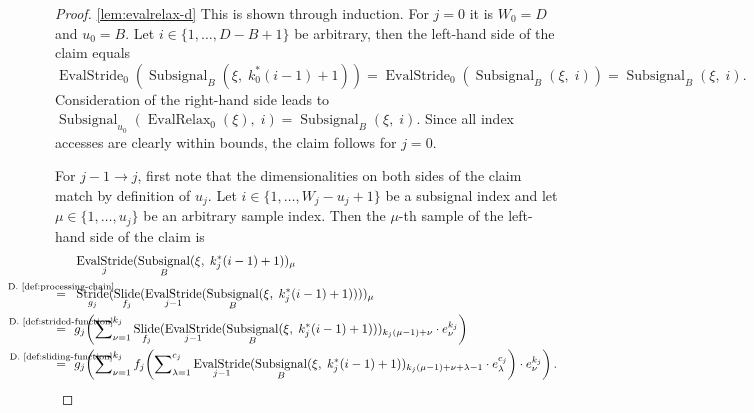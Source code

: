 \documentclass[journal]{IEEEtran}
\newcommand{\ROI}{B}
\newcommand{\discint}[2]{\{#1,\dotsc,#2\}}
\newcommand{\inint}[2]{\in\discint{#1}{#2}}
\DeclareMathOperator{\Subsignal}{Subsignal}
\DeclareMathOperator{\Slide}{Slide}
\DeclareMathOperator{\Stride}{Stride}
\DeclareMathOperator{\EvalStride}{EvalStride}
\newcommand{\equsing}[1]{\overset{\mathclap{\text{#1}}}{=}}
\DeclareMathOperator{\EvalRelax}{EvalRelax}
\begin{document}
\begin{proof}
\ref{lem:evalrelax-d}
This is shown through induction.
For $j = 0$ it is $W_0 = D$ and $u_0 = \ROI$.
Let $i\inint{1}{D - \ROI + 1}$ be arbitrary, then the left-hand side of the claim equals
\begin{displaymath}
  \EvalStride_0(\Subsignal_\ROI(\xi,\; k_0^*(i - 1) + 1)) = \EvalStride_0(\Subsignal_\ROI(\xi,\; i)) = \Subsignal_\ROI(\xi,\; i)\text{.}
\end{displaymath}
Consideration of the right-hand side leads to $\Subsignal_{u_0}(\EvalRelax_0(\xi),\; i) = \Subsignal_\ROI(\xi,\; i)$.
Since all index accesses are clearly within bounds, the claim follows for $j = 0$.

For $j - 1 \to j$, first note that the dimensionalities on both sides of the claim match by definition of $u_j$.
Let $i\inint{1}{W_j - u_j + 1}$ be a subsignal index and let $\mu\inint{1}{u_j}$ be an arbitrary sample index.
Then the $\mu$-th sample of the left-hand side of the claim is
\begin{align*}
  & \EvalStride_j(\Subsignal_\ROI(\xi,\; k_j^*(i - 1) + 1))_\mu\\
  \equsing{D.~\ref{def:processing-chain}}\ \ & \Stride_{g_j}(\Slide_{f_j}(\EvalStride_{j - 1}(\Subsignal_\ROI(\xi,\; k_j^*(i - 1) + 1))))_\mu\\
  \equsing{D.~\ref{def:strided-function}}\ \ & g_j\!\left( \sum\nolimits_{\nu = 1}^{k_j} \Slide_{f_j}(\EvalStride_{j - 1}(\Subsignal_\ROI(\xi,\; k_j^*(i - 1) + 1)))_{k_j(\mu - 1) + \nu}\cdot e_\nu^{k_j} \right)\\
  \equsing{D.~\ref{def:sliding-function}}\ \ & g_j\!\left( \sum\nolimits_{\nu = 1}^{k_j} f_j\!\left(\sum\nolimits_{\lambda = 1}^{c_j} \EvalStride_{j - 1}(\Subsignal_\ROI(\xi,\; k_j^*(i - 1) + 1))_{k_j(\mu - 1) + \nu + \lambda - 1}\cdot e_\lambda^{c_j}\right)\cdot e_\nu^{k_j} \right)\text{.}
\end{align*}


\end{proof}
\end{document}
